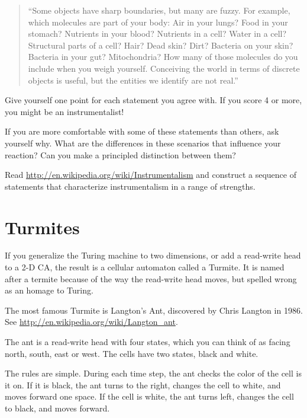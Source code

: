 \documentclass[10pt]{book}
\begin{document}
\begin{quote}
``Some objects have sharp boundaries, but many are fuzzy.  For
  example, which molecules are part of your body: Air in your lungs?
  Food in your stomach?  Nutrients in your blood?  Nutrients in a
  cell?  Water in a cell?  Structural parts of a cell?  Hair?  Dead
  skin?  Dirt?  Bacteria on your skin?  Bacteria in your gut?
  Mitochondria?  How many of those molecules do you include when you
  weigh yourself.  Conceiving the world in terms of discrete objects
  is useful, but the entities we identify are not real.''
\end{quote}

Give yourself one point for each statement you agree with.
If you score 4 or more, you might be an instrumentalist!

If you are more comfortable with some of these statements than
others, ask yourself why.  What are the differences in these
scenarios that influence your reaction?  Can you make
a principled distinction between them?

\begin{exercise}

Read \url{http://en.wikipedia.org/wiki/Instrumentalism}
and construct a sequence
of statements that characterize instrumentalism in a range of
strengths.

\end{exercise}


\section{Turmites}

If you generalize the Turing machine to two dimensions, or
add a read-write head to a 2-D CA, the result is a
cellular automaton called a Turmite.  It is named after a
termite because of the way the read-write head moves, but
spelled wrong as an homage to Turing.

The most famous Turmite is Langton's Ant, discovered by Chris Langton
in 1986.  See \url{http://en.wikipedia.org/wiki/Langton_ant}.

The ant is a read-write head with
four states, which you can think of as facing north, south,
east or west.  The cells have two states, black and white.

The rules are simple.  During each time step, the ant checks the color
of the cell is it on.  If it is black, the ant turns to the right,
changes the cell to white, and moves forward one space.  If the cell
is white, the ant turns left, changes the cell to black, and moves
forward.
\end{document}
